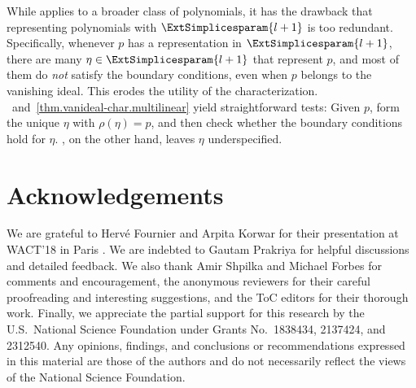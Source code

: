 While  applies to a broader class of
polynomials,
it has the drawback that representing polynomials with
\(\ExtSimplicesparam{l+1}\) is too redundant.
Specifically,
whenever \(p\) has a representation in \(\ExtSimplicesparam{l+1}\),
there are many \(\eta\in\ExtSimplicesparam{l+1}\) that represent \(p\),
and most of them do \emph{not} satisfy the boundary conditions,
even when \(p\) belongs to the vanishing ideal.
This erodes the utility of the characterization.
~and~\ref{thm.vanideal-char.multilinear} yield
straightforward tests:
Given \(p\),
form the unique \(\eta\) with \(\rho(\eta)=p\),
and then check whether the boundary conditions hold for \(\eta\).
, on the other hand, leaves \(\eta\) underspecified.

\section*{Acknowledgements}
We are grateful to Herv\'{e} Fournier and Arpita Korwar for their presentation at WACT'18 in Paris \cite{FournierKorwar2018}. 
We are indebted to Gautam Prakriya for helpful discussions and detailed feedback. 
We also thank Amir Shpilka and Michael Forbes for comments and encouragement, the anonymous reviewers for their careful proofreading and interesting suggestions, and the ToC editors for their thorough work.  
%
Finally, we appreciate the partial support for this research by the U.S.\ National Science Foundation under Grants No.\ 1838434, 2137424, and 2312540. Any opinions, findings, and conclusions or recommendations expressed in this material are those of the authors and do not necessarily reflect the views of the National Science Foundation.

%
%

%
%
%


